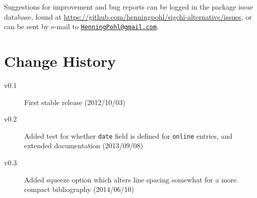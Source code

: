\documentclass[a4paper]{ltxdoc}
\begin{document}
Suggestions for improvement and bug reports can be logged in the package
issue database, found at 
\url{https://github.com/henningpohl/sigchi-alternative/issues}, 
or can be sent by e-mail to 
\href{mailto:HenningPohl@gmail.com}{\texttt{HenningPohl@gmail.com}}.

\nocite{*}
\printbibliography

\section*{Change History}
\begin{multicols}{2}
\begin{description}
  \item[v0.1] First stable release (2012/10/03)
  \item[v0.2] Added test for whether \texttt{date} field is defined for \texttt{online} entries, and extended documentation (2013/09/08)
  \item[v0.3] Added squeeze option which alters line spacing somewhat for a more compact bibliography (2014/06/10)
\end{description}
\end{multicols}
\end{document}
